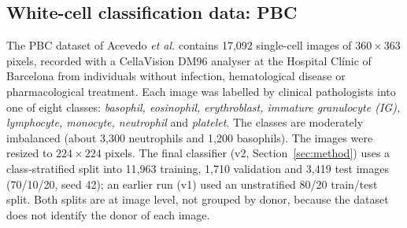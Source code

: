 \subsection{White-cell classification data: PBC}

The PBC dataset of Acevedo \emph{et al.} \cite{acevedo2020} contains 17{,}092 single-cell images of $360 \times 363$ pixels, recorded with a CellaVision DM96 analyser at the Hospital Clínic of Barcelona from individuals without infection, hematological disease or pharmacological treatment. Each image was labelled by clinical pathologists into one of eight classes: \emph{basophil, eosinophil, erythroblast, immature granulocyte (IG), lymphocyte, monocyte, neutrophil} and \emph{platelet}. The classes are moderately imbalanced (about 3{,}300 neutrophils and 1{,}200 basophils). The images were resized to $224 \times 224$ pixels. The final classifier (v2, Section~\ref{sec:method}) uses a class-stratified split into 11{,}963 training, 1{,}710 validation and 3{,}419 test images (70/10/20, seed 42); an earlier run (v1) used an unstratified 80/20 train/test split. Both splits are at image level, not grouped by donor, because the dataset does not identify the donor of each image.

\clearpage

